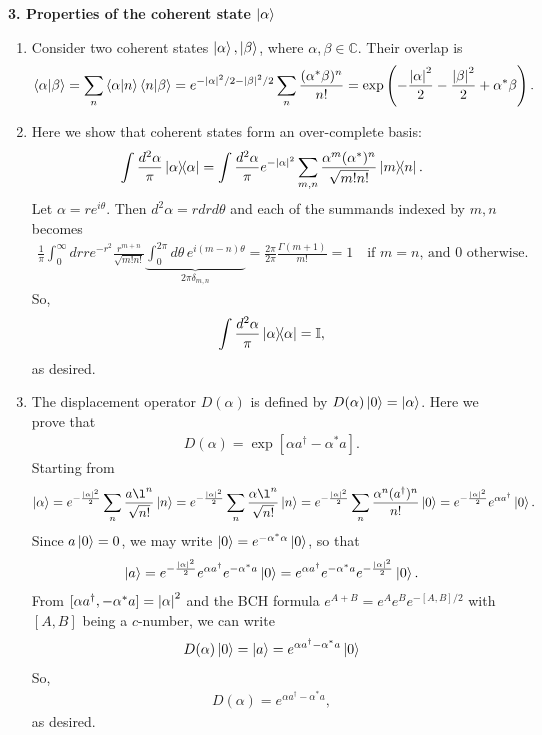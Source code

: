 \documentclass{article}
\theoremstyle{definition}
\newcommand{\al}{\alpha}
\newcommand{\be}{\beta}
\newcommand{\f}[2]{\frac{#1}{#2}}
\newcommand{\lp}{\left(}
\newcommand{\rp}{\right)}
\newcommand{\lb}{\left[}
\newcommand{\rb}{\right]}
\begin{document}
\noindent \textbf{3. Properties of the coherent state $\ket{\al}$}

\begin{enumerate}[label=\alph*)]
	\item Consider two coherent states $\ket{\al}, \ket{\be}$, where $\al,\be\in \mathbb{C}$. Their overlap is 
	\begin{align*}
		\bra{\al}\ket{\be} = \sum_n \braket{\al}{n}\braket{n}{\be} 
		= e^{-\abs{\al}^2/2 -\abs{\be}^2/2 }  \sum_n \f{(\al^* \be)^n}{n!} = \exp\lp -\f{\abs{\al}^2}{2} -\f{\abs{\be}^2}{2} + \al^*\be  \rp.
	\end{align*}


	\item Here we show that coherent states form an over-complete basis:
	\begin{align*}
		\int \f{d^2\al}{\pi} \ketbra{\al} = \int \f{d^2\al}{\pi} e^{-\abs{\al}^2} \sum_{m,n} \f{\al^m (\al^*)^n}{\sqrt{m!n!}} \ketbra{m}{n}.
	\end{align*}
	Let $\al = re^{i\theta}$. Then $d^2\al = r drd\theta$ and each of the summands indexed by $m,n$ becomes
	\begin{align*}
	\f{1}{\pi}\int_0^\infty dr r  e^{-r^2}  \f{r^{m+n}}{\sqrt{m!n!}} \underbrace{ \int_{0}^{2\pi} d\theta\, e^{i(m-n)\theta} }_{2\pi \delta_{m,n}} = \f{2\pi}{2\pi}\f{\Gamma(m+1)}{m!} = 1  \quad  \text{if $m=n$, and $0$ otherwise}.
	\end{align*}
	So, 
	\begin{align*}
	\int \f{d^2 \al}{\pi} \ketbra{\al} = \mathbb{I},
	\end{align*}
	as desired. 
	
	\item The displacement operator $D(\al)$ is defined by $D(\al)\ket{0} = \ket{\al}$. Here we prove that 
	\begin{align*}
		D(\al) = \exp\lb \al a^\dagger - \al^* a \rb.
	\end{align*}
	Starting from 
	\begin{align*}
	\ket{\al} = e^{-\f{\abs{\al}^2}{2}} \sum_{n} \f{a\l^n}{\sqrt{n!}}\ket{n} = e^{-\f{\abs{\al}^2}{2}} \sum_{n} \f{\al\l^n}{\sqrt{n!}}\ket{n} = e^{-\f{\abs{\al}^2}{2}} \sum_n \f{\al^n (a^\dagger)^n}{n!} \ket{0} = e^{-\f{\abs{\al}^2}{2}} e^{\al a^\dagger} \ket{0}.
	\end{align*}
	Since $a\ket{0} = 0$, we may write $\ket{0} = e^{-\al^* \al} \ket{0}$, so that
	\begin{align*}
	\ket{a} = e^{-\f{\abs{\al}^2}{2} } e^{\al a^\dagger} e^{-\al^* a} \ket{0} = e^{\al a^\dagger} e^{-\al^* a} e^{-\f{\abs{\al}^2}{2}} \ket{0}.
	\end{align*}
	From $[\al a^\dagger, -\al^* a] = \abs{\al}^2$ and the BCH formula $e^{A+B} = e^A e^B e^{-[A,B]/2}$ with $[A,B]$ being a $c$-number, we can write 
	\begin{align*}
	D(\al)\ket{0} = \ket{a} = e^{\al a^\dagger - \al^* a} \ket{0}
	\end{align*}
	So,
	\begin{align*}
	D(\al) = e^{\al a^\dagger - \al^* a},
	\end{align*}
	 as desired. 
	

\end{enumerate}
\end{document}
